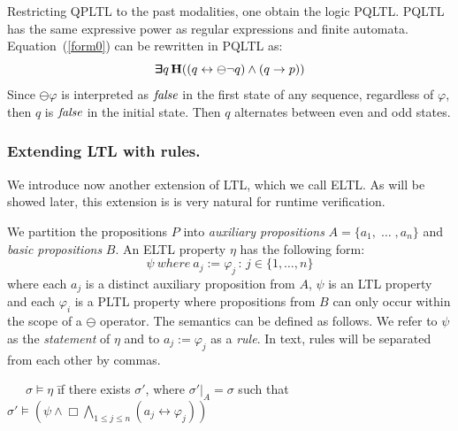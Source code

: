 Restricting QPLTL to the past modalities, one obtain the logic PQLTL. PQLTL has the same expressive
power as regular expressions and finite automata.
Equation~(\ref{form0}) can
be rewritten in PQLTL as:
\begin{equation} \label{form1} \bm{\exists}\kern-0.6em\bm{\exists} q \,
{\bf H} (( q \leftrightarrow \ominus \neg q )   \wedge (q \rightarrow p ) )\end{equation}
Since $\ominus \varphi $ is interpreted as  $\mathit{false}$ in the first state of any sequence, regardless of $\varphi$, then
$q$ is $\mathit{false}$ in the initial state. Then $q$ alternates between even and odd states.




\subsubsection{Extending LTL with rules.}

We introduce now another extension of LTL, which we call ELTL.
As will be showed later, this extension is
is very natural for runtime verification.

We partition the propositions $P$ into
{\em auxiliary propositions} $A = \{ a_1 , \; \ldots\; , a_n \}$
and {\em basic propositions} $B$.
An ELTL property $\eta$ has the following form: 
\begin{equation} \label{ELTL}
\psi \mathit{\ where\ } a_j  := \varphi_j \, : \, 
 {j \in \{1, \ldots , n\}} \end{equation}
where each $a_j$ is a distinct auxiliary proposition from $A$,
$\psi$ is an LTL property and each $\varphi_i$ 
is a PLTL property where propositions from $B$ can
only occur within the scope of a $\ominus$ operator.
The semantics can be defined as follows. We refer to $\psi$
as the {\em statement} of $\eta$ and to 
$a_j  := \varphi_j$ as a {\em rule}. In text, rules
 will be separated from each other by commas. 
\begin{tabbing}
\ \ \ $\sigma \models \eta$ \=  if there exists $\sigma'$, where
$\sigma' |_A = \sigma$ such that \\
 \> $\sigma' \models ( \psi  \wedge   \Box \bigwedge_{1 \leq j \leq n} ( a_j \leftrightarrow \varphi_j)) $
\end{tabbing}

